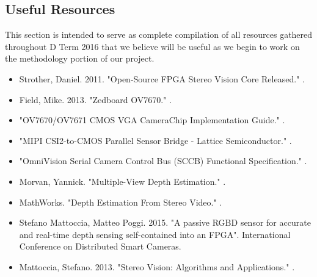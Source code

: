 \subsection{Useful Resources}
This section is intended to serve as complete compilation of all resources gathered throughout D Term 2016 that we believe will be useful as we begin to work on the methodology portion of our project.

\begin{itemize}
  \item Strother, Daniel. 2011. "Open-Source FPGA Stereo Vision Core Released." .
  
  \item Field, Mike. 2013. "Zedboard OV7670." .
  
  \item "OV7670/OV7671 CMOS VGA CameraChip Implementation Guide." .
  
  \item "MIPI CSI2-to-CMOS Parallel Sensor Bridge - Lattice Semiconductor." .
  
  \item "OmniVision Serial Camera Control Bus (SCCB) Functional Specification." .
  
  \item Morvan, Yannick. "Multiple-View Depth Estimation." .
  
  \item MathWorks. "Depth Estimation From Stereo Video." .
  
  \item Stefano Mattoccia, Matteo Poggi. 2015. "A passive RGBD sensor for accurate and real-time depth sensing self-contained into an FPGA". International Conference on Distributed Smart Cameras.
  
  \item Mattoccia, Stefano. 2013. "Stereo Vision: Algorithms and Applications." .
  

\end{itemize}

